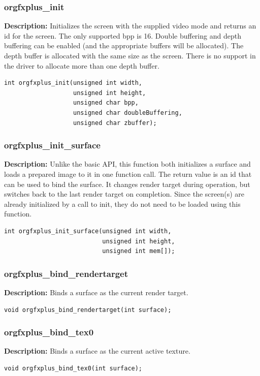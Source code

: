 \documentclass[10pt,a4paper]{article}
\begin{document}
\subsubsection{orgfxplus\_init}
\textbf{Description:} Initializes the screen with the supplied video mode and returns an id for the screen. The only supported bpp is 16. Double buffering and depth buffering can be enabled (and the appropriate buffers will be allocated). The depth buffer is allocated with the same size as the screen. There is no support in the driver to allocate more than one depth buffer.
\begin{lstlisting}
int orgfxplus_init(unsigned int width,
                   unsigned int height,
                   unsigned char bpp,
                   unsigned char doubleBuffering,
                   unsigned char zbuffer);
\end{lstlisting}

\subsubsection{orgfxplus\_init\_surface}
\textbf{Description:} Unlike the basic API, this function both initializes a surface and loads a prepared image to it in one function call. The return value is an id that can be used to bind the surface. It changes render target during operation, but switches back to the last render target on completion. Since the screen(s) are already initialized by a call to init, they do not need to be loaded using this function.
\begin{lstlisting}
int orgfxplus_init_surface(unsigned int width,
                           unsigned int height,
                           unsigned int mem[]);
\end{lstlisting}

\subsubsection{orgfxplus\_bind\_rendertarget}
\textbf{Description:} Binds a surface as the current render target.
\begin{lstlisting}
void orgfxplus_bind_rendertarget(int surface);
\end{lstlisting}

\subsubsection{orgfxplus\_bind\_tex0}
\textbf{Description:} Binds a surface as the current active texture.
\begin{lstlisting}
void orgfxplus_bind_tex0(int surface);
\end{lstlisting}
\end{document}
